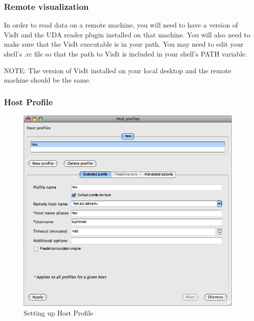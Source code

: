 \documentclass[12pt]{article}
\begin{document}



\subsubsection{Remote visualization}
In order to read data on a remote machine, you will need to have a
version of VisIt and the UDA reader plugin installed on that
machine. You will also need to make sure that the VisIt executable is
in your path. You may need to edit your shell's .rc file so that the
path to VisIt is included in your shell's PATH variable.

NOTE: The version of VisIt installed on your local desktop and the
remote machine should be the same.

\subsubsection{Host Profile}

\begin{figure}

   \vspace{-10pt}
  \begin{center}
    \includegraphics[width=.425\textwidth]{VisItHostProfile.png}
  \end{center}
   \vspace{-10pt}
  \caption{Setting up Host Profile}
   \vspace{-20pt}
  \label{VisItHostProfile}

\end{figure}
\end{document}
